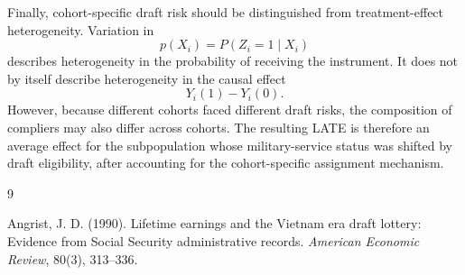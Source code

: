 \documentclass[11pt,a4paper]{article}
\begin{document}
Finally, cohort-specific draft risk should be distinguished from treatment-effect
heterogeneity. Variation in
\[
    p(X_i)=P(Z_i=1\mid X_i)
\]
describes heterogeneity in the probability of receiving the instrument. It does not by
itself describe heterogeneity in the causal effect
\[
    Y_i(1)-Y_i(0).
\]
However, because different cohorts faced different draft risks, the composition of
compliers may also differ across cohorts. The resulting LATE is therefore an average effect
for the subpopulation whose military-service status was shifted by draft eligibility, after
accounting for the cohort-specific assignment mechanism.


\begin{thebibliography}{9}

Angrist, J. D. (1990).
\newblock Lifetime earnings and the Vietnam era draft lottery: Evidence from Social Security administrative records.
\newblock \emph{American Economic Review}, 80(3), 313--336.

\end{thebibliography}
\end{document}

